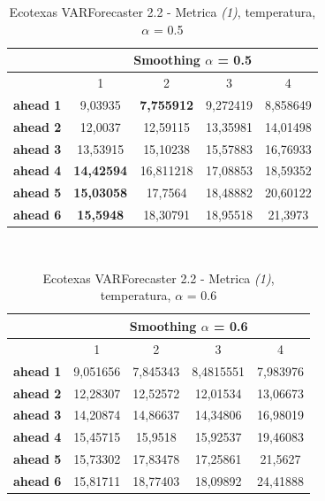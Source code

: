\documentclass[12pt,a4paper,oneside,openright]{book}
\begin{document}
\begin{table}[H]
\centering
\begin{tabular}{|c|c|c|c|c|}
\hline
 & \multicolumn{4}{|c|}{Smoothing $\alpha$ = 0.5} \\
\hline
& 1 & 2 & 3 & 4 \\
\hline
\textbf{ahead 1} & 9,03935 & \textbf{7,755912} & 9,272419 & 8,858649\\
\hline
\textbf{ahead 2} & 12,0037 & 12,59115 & 13,35981 & 14,01498\\ 
\hline
\textbf{ahead 3} & 13,53915 & 15,10238 & 15,57883 & 16,76933\\
\hline
\textbf{ahead 4} & \textbf{14,42594} & 16,811218 & 17,08853 & 18,59352\\ 
\hline
\textbf{ahead 5} & \textbf{15,03058} & 17,7564 & 18,48882 & 20,60122\\
\hline
\textbf{ahead 6} & \textbf{15,5948} & 18,30791 & 18,95518 & 21,3973\\ 
\hline
\end{tabular} \\
\caption{Ecotexas VARForecaster 2.2 - Metrica \textit{(1)}, temperatura, $\alpha$ = 0.5}
\end{table} 

\medskip

\begin{table}[H]
\centering
\begin{tabular}{|c|c|c|c|c|}
\hline
 & \multicolumn{4}{|c|}{Smoothing $\alpha$ = 0.6} \\
\hline
& 1 & 2 & 3 & 4 \\
\hline
\textbf{ahead 1} & 9,051656 & 7,845343 & 8,4815551 & 7,983976\\
\hline
\textbf{ahead 2} & 12,28307 & 12,52572 & 12,01534 & 13,06673\\ 
\hline
\textbf{ahead 3} & 14,20874 &  14,86637&  14,34806& 16,98019\\
\hline
\textbf{ahead 4} & 15,45715 & 15,9518 & 15,92537 & 19,46083\\ 
\hline
\textbf{ahead 5} & 15,73302 & 17,83478 & 17,25861 & 21,5627\\
\hline
\textbf{ahead 6} & 15,81711 & 18,77403 & 18,09892 & 24,41888\\ 
\hline
\end{tabular} \\
\caption{Ecotexas VARForecaster 2.2 - Metrica \textit{(1)}, temperatura, $\alpha$ = 0.6}
\end{table} 

\medskip
\end{document}
